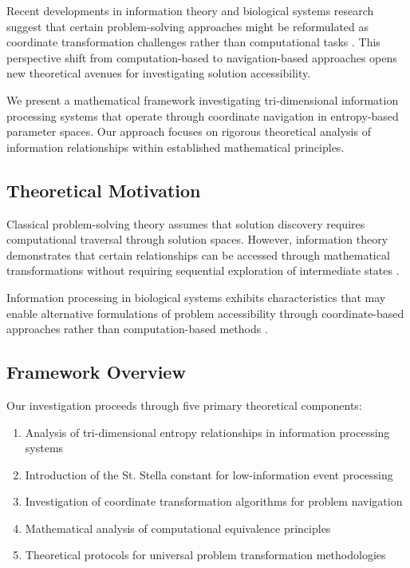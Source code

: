\documentclass[12pt,a4paper]{article}
\begin{document}
Recent developments in information theory and biological systems research suggest that certain problem-solving approaches might be reformulated as coordinate transformation challenges rather than computational tasks \cite{cover2006elements, friston2010free}. This perspective shift from computation-based to navigation-based approaches opens new theoretical avenues for investigating solution accessibility.

We present a mathematical framework investigating tri-dimensional information processing systems that operate through coordinate navigation in entropy-based parameter spaces. Our approach focuses on rigorous theoretical analysis of information relationships within established mathematical principles.

\subsection{Theoretical Motivation}

Classical problem-solving theory assumes that solution discovery requires computational traversal through solution spaces. However, information theory demonstrates that certain relationships can be accessed through mathematical transformations without requiring sequential exploration of intermediate states \cite{shannon1948mathematical}.

Information processing in biological systems exhibits characteristics that may enable alternative formulations of problem accessibility through coordinate-based approaches rather than computation-based methods \cite{tononi2008consciousness, friston2010free}.

\subsection{Framework Overview}

Our investigation proceeds through five primary theoretical components:

\begin{enumerate}
\item Analysis of tri-dimensional entropy relationships in information processing systems
\item Introduction of the St. Stella constant for low-information event processing
\item Investigation of coordinate transformation algorithms for problem navigation
\item Mathematical analysis of computational equivalence principles
\item Theoretical protocols for universal problem transformation methodologies
\end{enumerate}
\end{document}
